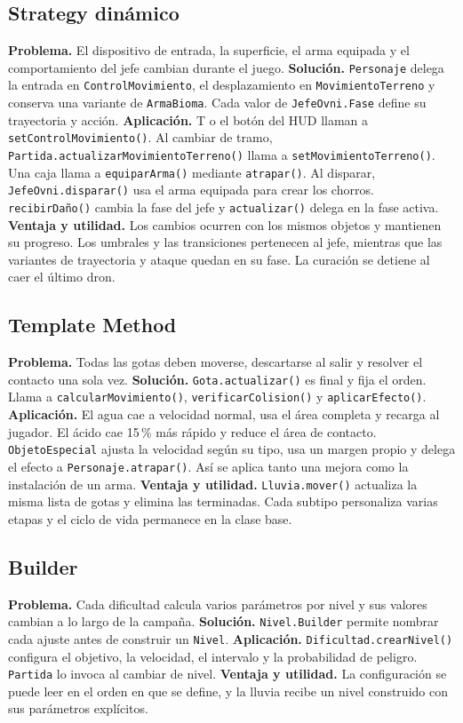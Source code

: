 \subsection{Strategy dinámico}
\textbf{Problema.} El dispositivo de entrada, la superficie, el arma equipada y el comportamiento del jefe cambian durante el juego.
\textbf{Solución.} \texttt{Personaje} delega la entrada en \texttt{ControlMovimiento}, el desplazamiento en \texttt{MovimientoTerreno} y conserva una variante de \texttt{ArmaBioma}. Cada valor de \texttt{JefeOvni.Fase} define su trayectoria y acción.
\textbf{Aplicación.} T o el botón del HUD llaman a \texttt{setControlMovimiento()}. Al cambiar de tramo, \texttt{Partida.actualizarMovimientoTerreno()} llama a \texttt{setMovimientoTerreno()}. Una caja llama a \texttt{equiparArma()} mediante \texttt{atrapar()}. Al disparar, \texttt{JefeOvni.disparar()} usa el arma equipada para crear los chorros. \texttt{recibirDaño()} cambia la fase del jefe y \texttt{actualizar()} delega en la fase activa.
\textbf{Ventaja y utilidad.} Los cambios ocurren con los mismos objetos y mantienen su progreso. Los umbrales y las transiciones pertenecen al jefe, mientras que las variantes de trayectoria y ataque quedan en su fase. La curación se detiene al caer el último dron.

\subsection{Template Method}
\textbf{Problema.} Todas las gotas deben moverse, descartarse al salir y resolver el contacto una sola vez.
\textbf{Solución.} \texttt{Gota.actualizar()} es final y fija el orden. Llama a \texttt{calcularMovimiento()}, \texttt{verificarColision()} y \texttt{aplicarEfecto()}.
\textbf{Aplicación.} El agua cae a velocidad normal, usa el área completa y recarga al jugador. El ácido cae 15\,\% más rápido y reduce el área de contacto. \texttt{ObjetoEspecial} ajusta la velocidad según su tipo, usa un margen propio y delega el efecto a \texttt{Personaje.atrapar()}. Así se aplica tanto una mejora como la instalación de un arma.
\textbf{Ventaja y utilidad.} \texttt{Lluvia.mover()} actualiza la misma lista de gotas y elimina las terminadas. Cada subtipo personaliza varias etapas y el ciclo de vida permanece en la clase base.

\subsection{Builder}
\textbf{Problema.} Cada dificultad calcula varios parámetros por nivel y sus valores cambian a lo largo de la campaña.
\textbf{Solución.} \texttt{Nivel.Builder} permite nombrar cada ajuste antes de construir un \texttt{Nivel}.
\textbf{Aplicación.} \texttt{Dificultad.crearNivel()} configura el objetivo, la velocidad, el intervalo y la probabilidad de peligro. \texttt{Partida} lo invoca al cambiar de nivel.
\textbf{Ventaja y utilidad.} La configuración se puede leer en el orden en que se define, y la lluvia recibe un nivel construido con sus parámetros explícitos.


